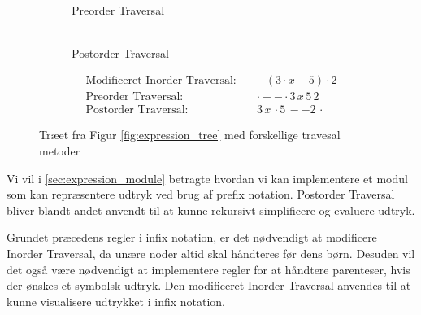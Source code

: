 \begin{figure}[H]
\begin{subfigure}{0.3\textwidth}
    \caption{\\Preorder Traversal}
  \end{subfigure}
  \hfill
  \begin{subfigure}{0.3\textwidth}
    \centering
    \caption{\\Postorder Traversal}
  \end{subfigure}
  \begin{align*}
      \text{Modificeret Inorder Traversal:} \quad & - (3 \cdot x - 5) \cdot 2 \\
      \text{Preorder Traversal:} \quad &  \cdot - - \cdot 3\, x\, 5\, 2  \\
      \text{Postorder Traversal:} \quad & 3\, x\, \cdot 5\, - -  2\, \cdot
  \end{align*}
  \caption{Træet fra Figur \ref{fig:expression_tree} med forskellige travesal metoder}
  \label{fig:expression_tree_traversal}
\end{figure}


Vi vil i \ref{sec:expression_module} betragte hvordan vi kan implementere et modul som kan repræsentere udtryk ved brug af prefix notation.
Postorder Traversal bliver blandt andet anvendt til at kunne rekursivt simplificere og evaluere udtryk.

Grundet præcedens regler i infix notation, er det nødvendigt at modificere Inorder Traversal, da unære noder altid skal håndteres før dens børn. Desuden vil det også være nødvendigt at implementere regler for at håndtere parenteser, hvis der ønskes et symbolsk udtryk. Den modificeret Inorder Traversal anvendes til at kunne visualisere udtrykket i infix notation.


